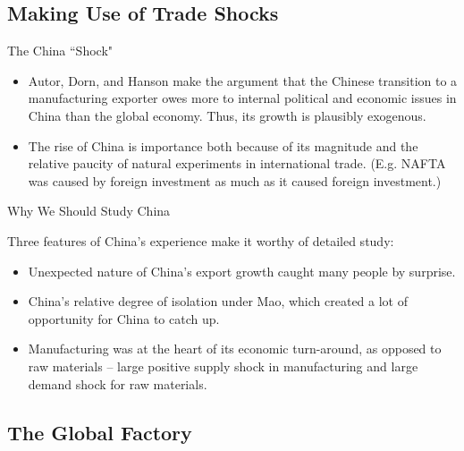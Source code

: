 \documentclass[aspectratio=169]{beamer}
\begin{document}

\subsection{Making Use of Trade Shocks}


\begin{frame}{The China ``Shock"}

\begin{itemize}
    \item<1-> Autor, Dorn, and Hanson make the argument that the Chinese transition to a manufacturing exporter owes more to internal political and economic issues in China than the global economy.  Thus, its growth is plausibly exogenous.
    \item<2-> The rise of China is importance both because of its magnitude and the relative paucity of natural experiments in international trade.  (E.g. NAFTA was caused by foreign investment as much as it caused foreign investment.)
\end{itemize}
    
\end{frame}


\begin{frame}{Why We Should Study China}

Three features of China’s experience make it worthy of detailed study:

\begin{itemize}
    \item<1-> Unexpected nature of China’s export growth caught many people by surprise.
    \item<2-> China’s relative degree of isolation under Mao, which created a lot of opportunity for China to catch up.
    \item<3->  Manufacturing was at the heart of its economic turn-around, as opposed to raw materials – large positive supply shock in manufacturing and large demand shock for raw materials.
\end{itemize}
    
\end{frame}


\subsection{The Global Factory}
\end{document}

